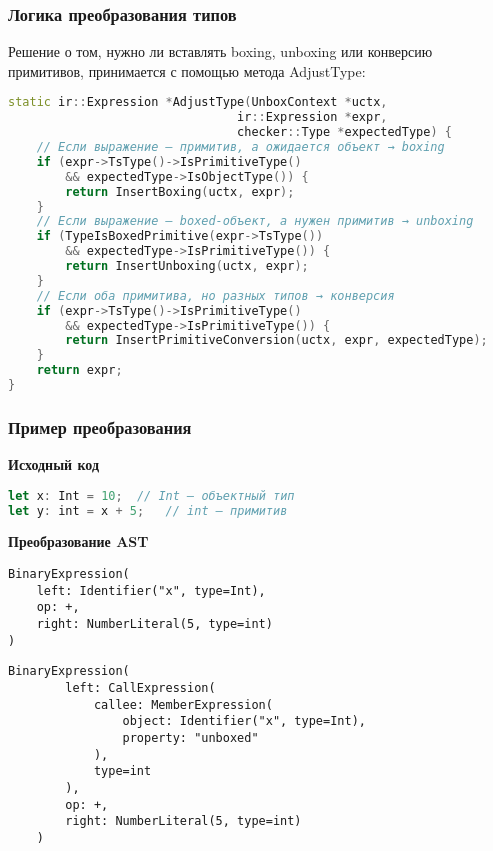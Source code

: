 \subsubsection{Логика преобразования типов}
Решение о том, нужно ли вставлять boxing, unboxing или конверсию примитивов, принимается с помощью метода AdjustType:
\begin{lstlisting}[language=C++,caption=Метод AdjustType]
static ir::Expression *AdjustType(UnboxContext *uctx,
                                ir::Expression *expr,
                                checker::Type *expectedType) {
    // Если выражение — примитив, а ожидается объект → boxing
    if (expr->TsType()->IsPrimitiveType()
        && expectedType->IsObjectType()) {
        return InsertBoxing(uctx, expr);
    }
    // Если выражение — boxed-объект, а нужен примитив → unboxing
    if (TypeIsBoxedPrimitive(expr->TsType())
        && expectedType->IsPrimitiveType()) {
        return InsertUnboxing(uctx, expr);
    }
    // Если оба примитива, но разных типов → конверсия
    if (expr->TsType()->IsPrimitiveType()
        && expectedType->IsPrimitiveType()) {
        return InsertPrimitiveConversion(uctx, expr, expectedType);
    }
    return expr;
}
\end{lstlisting}

\subsubsection{Пример преобразования}

\textbf{Исходный код}
\begin{lstlisting}[language=TypeScript]
let x: Int = 10;  // Int — объектный тип
let y: int = x + 5;   // int — примитив
\end{lstlisting}

\textbf{Преобразование AST}
\begin{lstlisting}[caption=AST до оптимизации]
BinaryExpression(
    left: Identifier("x", type=Int),
    op: +,
    right: NumberLiteral(5, type=int)
)
\end{lstlisting}


\begin{lstlisting}[caption=AST после оптимизации]
    BinaryExpression(
        left: CallExpression(
            callee: MemberExpression(
                object: Identifier("x", type=Int),
                property: "unboxed"
            ),
            type=int
        ),
        op: +,
        right: NumberLiteral(5, type=int)
    )
\end{lstlisting}

